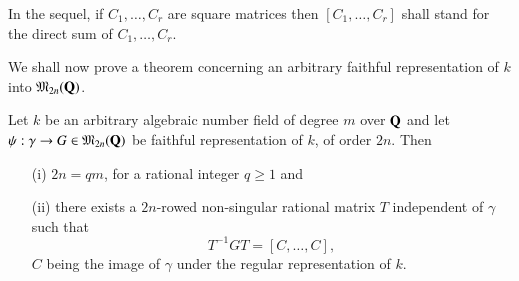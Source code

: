 In the sequel, if $C_{1},\ldots,C_{r}$ are square matrices then
$[C_{1},\ldots,C_{r}]$ shall stand for the direct sum of
$C_{1},\ldots,C_{r}$.

We shall now prove a theorem concerning an arbitrary faithful
representation of $k$ into $\mathfrak{M}_{2n}(\mathbf{Q})$.

\begin{thm}\label{thm14}
Let $k$ be an arbitrary algebraic number field of degree $m$ over
$\mathbf{Q}$ and let $\psi:\gamma\to G\in\mathfrak{M}_{2n}(\mathbf{Q})$ be faithful
representation of $k$, of order $2n$. Then
\begin{itemize}
\item[\rm(i)] $2n=qm$, for a rational integer $q\geq 1$ and

\item[\rm(ii)] there exists a $2n$-rowed non-singular rational matrix
  $T$ independent of $\gamma$ such that
$$
T^{-1}GT=[C,\ldots,C],
$$
$C$ being the image of $\gamma$ under the regular representation of
$k$.
\end{itemize}
\end{thm}

